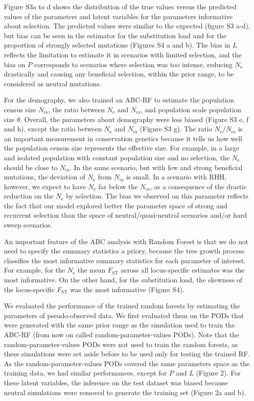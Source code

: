 \documentclass[a4paper, 12pt]{article}
\begin{document}
Figure S3a to d shows the distribution of the true values versus the predicted values of the parameters and latent variables for the parameters informative about selection. The predicted values were similar to the expected (figure S3 a-d), but bias can be seen in the estimator for the substitution load and for the proportion of strongly selected mutations (Figures S4 a and b). The bias in $L$ reflects the limitation to estimate it in scenarios with limited selection, and the bias on $P$ corresponds to scenarios where selection was too intense, reducing $N_{\mathrm{e}}$ drastically and causing any beneficial selection, within the prior range, to be considered as neutral mutations.

For the demography, we also trained an ABC-RF to estimate the population census size $N_{\mathrm{cs}}$, the ratio between $N_{\mathrm{e}}$ and $N_{\mathrm{cs}}$, and population scale population size $\theta$. Overall, the parameters about demography were less biased (Figure S3 e, f and h), except the ratio between $N_{\mathrm{e}}$ and $N_{\mathrm{cs}}$ (Figure S3 g). The ratio $N_{\mathrm{e}}/N_{\mathrm{cs}}$ is an important measurement in conservation genetics because it tells us how well the population census size represents the effective size. For example, in a large and isolated population with constant population size and no selection, the $N_{\mathrm{e}}$ should be close to $N_{\mathrm{cs}}$. In the same scenario, but with few and strong beneficial mutations, the deviation of $N_{\mathrm{e}}$ from $N_{\mathrm{cs}}$ is small. In a scenario with RHH, however, we expect to have $N_{\mathrm{e}}$ far below the $N_{\mathrm{cs}}$, as a consequence of the drastic reduction on the $N_{\mathrm{e}}$ by selection. The bias we observed on this parameter reflects the fact that our model explored better the parameter space of strong and recurrent selection than the space of neutral/quasi-neutral scenarios and/or hard sweep scenarios.

An important feature of the ABC analysis with Random Forest is that we do not need to specify the summary statistics a priory, because the tree growth process classifies the most informative summary statistics for each parameter of interest. For example, for the $N_{\mathrm{e}}$ the mean $F_{\mathrm{ST}}$ across all locus-specific estimates was the most informative. On the other hand, for the substitution load, the skewness of the locus-specific $F_{\mathrm{ST}}$ was the most informative (Figure S4).

We evaluated the performance of the trained random forests by estimating the parameters of pseudo-observed data. We first evaluated them on the PODs that were generated with the same prior range as the simulation used to train the ABC-RF (from now on called random-parameter-values PODs). Note that the random-parameter-values PODs were not used to train the random forests, as these simulations were set aside before to be used only for testing the trained RF. As the random-parameter-values PODs covered the same parameters space as the training data, we had similar performances, except for $P$ and $L$ (Figure 2). For these latent variables, the inference on the test dataset was biased because neutral simulations were removed to generate the training set (Figure 2a and b).
\end{document}
